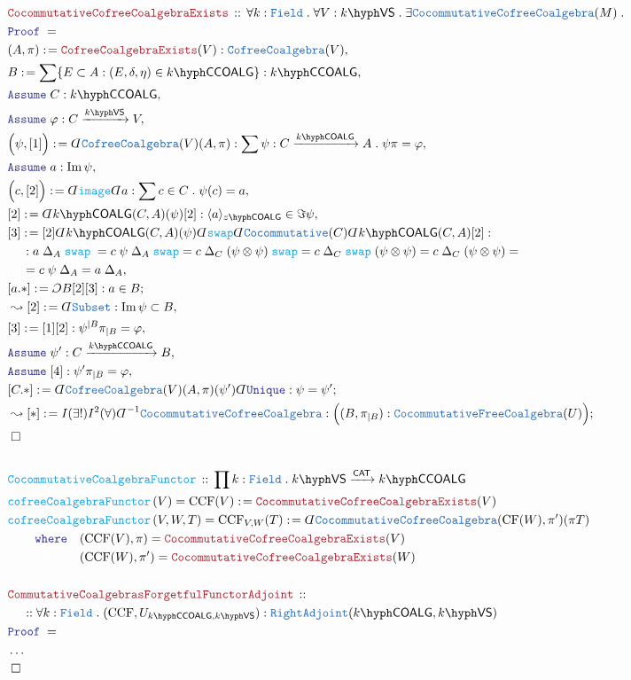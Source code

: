 \documentclass[12pt]{scrartcl}%
\newcommand{\TYPE}[1]{\textcolor{NavyBlue}{\mathtt{#1}}}%
\newcommand{\FUNC}[1]{\textcolor{Cerulean}{\mathtt{#1}}}%
\newcommand{\LOGIC}[1]{\textcolor{Blue}{\mathtt{#1}}}%
\newcommand{\THM}[1]{\textcolor{Maroon}{\mathtt{#1}}}%
\renewcommand{\.}{\; . \;} %
\newcommand{\de}{: \kern 0.1pc =} %
\newcommand{\where}{\LOGIC{where}} %
\newcommand{\Act}[1]{\left( #1 \right)} %
\newcommand{\Theorem}[2]{& \THM{#1} \, :: \, #2 \\ & \Proof = \\ } %
\newcommand{\DeclareFunc}[2]{& \FUNC{#1} \, :: \, #2 \\}%
\newcommand{\DefineNamedFunc}[4]{&  \FUNC{#1}\Act{#2} = #3 \de #4 \\}%
\newcommand{\NewLine}{\\ & \kern 1pc}%
\newcommand{\Page}[1]{ \begin{align*} #1 \end{align*}  }%
\newcommand{ \bd }{ \ByDef }%
\newcommand{\NoProof}{ & \ldots \\ \EndProof}%
\DeclareMathOperator*{\im}{Im}%
\newcommand{\Say}[3]{& #1 \de #2 : #3, \\} %
\newcommand{\Conclude}[3]{& #1 \de #2 : #3; \\}%
\newcommand{\Derive}[3]{& \leadsto #1 \de #2 : #3, \\} %
\newcommand{\DeriveConclude}[3]{& \leadsto #1 \de #2 : #3 ; \\} %
\newcommand{\Assume}[2]{& \LOGIC{Assume} \; #1 : #2, \\} %
\newcommand{\QED}{\; \square} %
\newcommand{\EndProof}{& \QED \\} %
\newcommand{\ByDef}{\rotatebox[origin=c]{-180}{$D$}}%
\newcommand{\ByConstr}{\rotatebox[origin=c]{-180}{$C$}}%
\newcommand{\Proof}{\LOGIC{Proof} \; } %
\newcommand{\Arrow}[1]{\xrightarrow{#1}}%
\newcommand{\CAT}{\mathsf{CAT}} %
\newcommand{\VS}[1]{#1\hyph\mathsf{VS}} %
\newcommand{\Field}{\TYPE{Field}}
\newcommand{\COALG}[1]{#1\hyph\mathsf{COALG}}%
\newcommand{\CCOALG}[1]{#1\hyph\mathsf{CCOALG}}%
\begin{document}
\Page{
	\Theorem{CocommutativeCofreeCoalgebraExists}
	{
		\forall k : \Field \.
		\forall V : \VS{k} \.
		\exists \TYPE{CocommutativeCofreeCoalgebra}(M) \.
	}
	\Say{(A,\pi)}{\THM{CofreeCoalgebraExists}(V)}{\TYPE{CofreeCoalgebra}(V)}
	\Say{B}{\sum \{ E \subset A : (E,\delta,\eta) \in \CCOALG{k} \}}{\CCOALG{k}}
	\Assume{C}{\CCOALG{k}}
	\Assume{\varphi}{C \Arrow{\VS{k}} V}
	\Say{\Big(\psi,[1]\Big)}{\bd \TYPE{CofreeCoalgebra}(V)(A,\pi)}{ \sum \psi : C \Arrow{\COALG{k}} A \. \psi \pi = \varphi}
	\Assume{a}{\im \psi}
	\Say{\Big(c,[2]\Big)}{\bd \FUNC{image}\bd a}{\sum c \in C \. \psi(c) = a}
	\Say{[2]}{\bd \COALG{k}(C,A)(\psi)[2] }{\langle a \rangle_{\COALG{z}} \in \Im \psi}
	\Say{[3]}{ [2] \bd \COALG{k}(C,A)(\psi) \bd \FUNC{swap} \bd \TYPE{Cocommutative}(C) \bd \COALG{k}(C,A) [2]  }
	{ 
		\NewLine : 
		a \; \Delta_A \; \FUNC{swap} \;   =  
		c \; \psi \; \Delta_A  \;\FUNC{swap}   =
		c \; \Delta_C \; (\psi \otimes \psi) \; \FUNC{swap}  = 
		c \; \Delta_C \; \FUNC{swap} \; (\psi \otimes \psi)  =
		c \; \Delta_C \; (\psi \otimes \psi)  = \NewLine = 
		c \; \psi \; \Delta_A =
		a \; \Delta_A
	}
	\Conclude{[a.*]}{\ByConstr B[2][3]}{a \in B}
	\Derive{[2]}{\bd \TYPE{Subset}}{\im \psi \subset B}
	\Say{[3]}{[1][2]}{  \psi^{|B}\pi_{|B} = \varphi }
	\Assume{\psi'}{ C  \Arrow{\CCOALG{k}} B }
	\Assume{[4]}{\psi' \pi_{|B} = \varphi}
	\Conclude{[C.*]}{\bd \TYPE{CofreeCoalgebra}(V)(A,\pi)(\psi')\bd \LOGIC{Unique}}{\psi = \psi'}
	\DeriveConclude{[*]}{I(\exists!)I^2(\forall)\bd^{-1}\TYPE{CocommutativeCofreeCoalgebra}}
	{\Big( (B,\pi_{|B}) : \TYPE{CocommutativeFreeCoalgebra}(U) \Big) }
	\EndProof
	\\
	\DeclareFunc{CocommutativeCoalgebraFunctor}{\prod k : \Field \. \VS{k} \Arrow{\CAT} \CCOALG{k}}
	\DefineNamedFunc{cofreeCoalgebraFunctor}{V}{\mathrm{CCF}(V)}{\THM{CocommutativeCofreeCoalgebraExists}(V)}
	\DefineNamedFunc{cofreeCoalgebraFunctor}{V,W,T}{\mathrm{CCF}_{V,W}(T)}{ \bd \TYPE{CocommutativeCofreeCoalgebra}(\mathrm{CF}(W),\pi')(\pi T)  
		\NewLine
		\quad \where \quad (\mathrm{CCF}(V),\pi) = \THM{CocommutativeCofreeCoalgebraExists}(V) 
		\NewLine
		\quad {\color{white} \mathtt{where}} \quad (\mathrm{CCF}(W),\pi') = \THM{CocommutativeCofreeCoalgebraExists}(W)
	}
	\\
	\Theorem{CommutativeCoalgebrasForgetfulFunctorAdjoint}
	{
		\NewLine
		::
		\forall k : \Field \. 
		(\mathrm{CCF},U_{\CCOALG{k},\VS{k}}) : \TYPE{RightAdjoint}(\COALG{k},\VS{k})
	}
	\NoProof	
}
\end{document}
